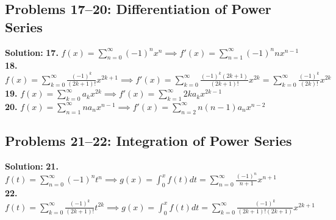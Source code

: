 \documentclass[11pt, letterpaper]{article}
\theoremstyle{definition}
\theoremstyle{remark}
\begin{document}
\subsection{Problems 17--20: Differentiation of Power Series}
\textbf{Solution:}
\textbf{17.} $f(x) = \sum_{n=0}^{\infty} (-1)^n x^n \implies f'(x) = \sum_{n=1}^{\infty} (-1)^n n x^{n-1}$
\\[4pt]
\textbf{18.} $f(x) = \sum_{k=0}^{\infty} \frac{(-1)^k}{(2k+1)!} x^{2k+1} \implies f'(x) = \sum_{k=0}^{\infty} \frac{(-1)^k (2k+1)}{(2k+1)!} x^{2k} = \sum_{k=0}^{\infty} \frac{(-1)^k}{(2k)!} x^{2k}$
\\[4pt]
\textbf{19.} $f(x) = \sum_{k=0}^{\infty} a_k x^{2k} \implies f'(x) = \sum_{k=1}^{\infty} 2k a_k x^{2k-1}$
\\[4pt]
\textbf{20.} $f(x) = \sum_{n=1}^{\infty} n a_n x^{n-1} \implies f'(x) = \sum_{n=2}^{\infty} n(n-1) a_n x^{n-2}$

\subsection{Problems 21--22: Integration of Power Series}
\textbf{Solution:}
\textbf{21.} $f(t) = \sum_{n=0}^{\infty} (-1)^n t^n \implies g(x) = \int_0^x f(t) dt = \sum_{n=0}^{\infty} \frac{(-1)^n}{n+1} x^{n+1}$
\\[4pt]
\textbf{22.} $f(t) = \sum_{k=0}^{\infty} \frac{(-1)^k}{(2k+1)!} t^{2k} \implies g(x) = \int_0^x f(t) dt = \sum_{k=0}^{\infty} \frac{(-1)^k}{(2k+1)!(2k+1)} x^{2k+1}$
\end{document}
